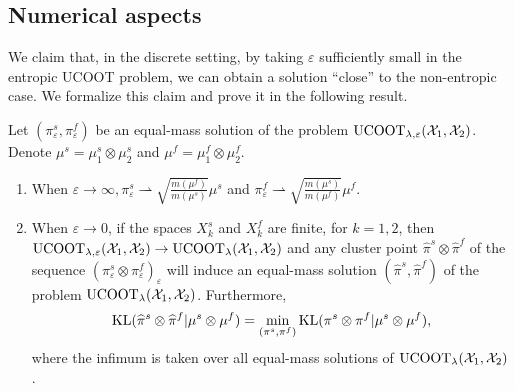 \subsection{Numerical aspects}
We claim that, in the discrete setting, by taking $\varepsilon$ sufficiently small in the entropic UCOOT problem, we can obtain a solution ``close'' to the non-entropic case. We formalize this claim and prove it in the following result.
\begin{claim}
  \label{convergence_minimiser_unbalanced}
  Let $(\pi_{\varepsilon}^s, \pi_{\varepsilon}^f)$ be an equal-mass solution of the problem
  $\text{UCOOT}_{\lambda, \varepsilon}(\mathcal X_1, \mathcal X_2)$. Denote $\mu^s = \mu_1^s \otimes \mu_2^s$ and $\mu^f = \mu_1^f \otimes \mu_2^f$.
  \begin{enumerate}
    \item When $\varepsilon \to \infty, \pi_{\varepsilon}^s \rightharpoonup \sqrt{\frac{m(\mu^f)}{m(\mu^s)}} \mu^s$
    and $\pi_{\varepsilon}^f  \rightharpoonup \sqrt{\frac{m(\mu^s)}{m(\mu^f)}} \mu^f$.

    \item When $\varepsilon \to 0$, if the spaces $X_k^s$ and $X_k^f$ are finite,
    for $k=1,2$, then $\text{UCOOT}_{\lambda, \varepsilon}(\mathcal X_1, \mathcal X_2) \to \text{UCOOT}_{\lambda}(\mathcal X_1, \mathcal X_2)$ and
    any cluster point $\widehat{\pi}^s \otimes \widehat{\pi}^f$ of the sequence
    $(\pi_{\varepsilon}^s \otimes \pi_{\varepsilon}^f)_{\varepsilon}$ will induce an equal-mass
    solution $(\widehat{\pi}^s, \widehat{\pi}^f)$ of the problem
    $\text{UCOOT}_{\lambda}(\mathcal X_1, \mathcal X_2)$. Furthermore,
    \begin{equation}
      \text{KL}(\widehat{\pi}^s \otimes \widehat{\pi}^f | \mu^s \otimes \mu^f) =
      \min_{(\pi^s, \pi^f)} \text{KL}(\pi^s \otimes \pi^f \vert \mu^s \otimes \mu^f),
    \end{equation}
    where the infimum is taken over all equal-mass solutions of $\text{UCOOT}_{\lambda}(\mathcal X_1, \mathcal X_2)$.
  \end{enumerate}
\end{claim}
